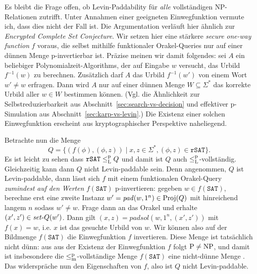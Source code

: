 Es bleibt die Frage offen, ob Levin-Paddability für \emph{alle} vollständigen NP-Relationen zutrifft. Unter Annahmen einer geeigneten Einwegfunktion vermute ich, dass dies nicht der Fall ist.
Die Argumentation verläuft hier ähnlich zur \emph{Encrypted Complete Set Conjecture}.
Wir setzen hier eine stärkere \emph{secure one-way function} \parencite{grollmann_complexity_1988} $f$ voraus, die selbst mithilfe funktionaler Orakel-Queries nur auf einer dünnen Menge p-invertierbar ist.
Präzise meinen wir damit folgendes: sei $A$ ein beliebiger Polynomialzeit-Algorithms, der auf Eingabe $w$ versucht, das Urbild $f^{-1}(w)$ zu berechnen. Zusätzlich darf $A$ das Urbild $f^{-1}(w')$ von einem Wort $w'\neq w$ erfragen. Dann wird $A$ nur auf einer dünnen Menge $W\subseteq\Sigma^*$ das korrekte Urbild aller $w\in W$ bestimmen können.
%
%
(Vgl. die Ähnlichkeit zur Selbstreduzierbarkeit aus Abschnitt~\ref{sec:search-vs-decision} und effektiver p-Simulation aus Abschnitt~\ref{sec:karp-vs-levin}.)
Die Existenz einer solchen Einwegfunktion erscheint aus kryptographischer Perspektive naheliegend.

Betrachte nun die Menge
\[ Q = \{ (f(\phi), (\phi, z)) \mid x,z\in\Sigma^*, (\phi,z)\in\mathtt{rSAT}\}. \]
Es ist leicht zu sehen dass $\mathtt{rSAT}\leq_\mathrm{L}^\mathrm{p} Q$ und damit ist $Q$ auch $\leq_\mathrm{L}^\mathrm{p}$-vollständig.
Gleichzeitig kann dann $Q$ nicht Levin-paddable sein.
Denn angenommen, $Q$ ist Levin-paddable, dann lässt sich $f$ mit einem funktionalen Orakel-Query \emph{zumindest auf den Werten $f(\mathtt{SAT})$} p-invertieren: gegeben $w\in f(\mathtt{SAT})$, berechne erst eine zweite Instanz $w'=\mathit{pad}(w, 1^n)\in\operatorname{Proj}(Q)$ mit hinreichend langem $n$ sodass $w'\neq w$. Frage dann an das Orakel und erhalte $(x',z')\in \mathit{set}\text{-}{}Q(w')$.
Dann gilt $(x,z) = \mathit{padsol}(w, 1^n, (x',z'))$ mit $f(x)=w$, i.e. $x$ ist das gesuchte Urbild von $w$.
Wir können also auf der Bildmenge  $f(\mathtt{SAT})$ die Einwegfunktion $f$ invertieren.
Diese Menge ist tatsächlich nicht dünn: aus aus der Existenz der Einwegfunktion $f$ folgt $\mathrm{P}\neq\mathrm{NP}$, und damit ist insbesondere die $\leq_\mathrm{m}^\mathrm{p}$-vollständige Menge $f(\mathtt{SAT})$ eine nicht-dünne Menge \parencite{mahaney_sparse_1982}.
Das widerspräche nun den Eigenschaften von $f$, also ist $Q$ nicht Levin-paddable.

